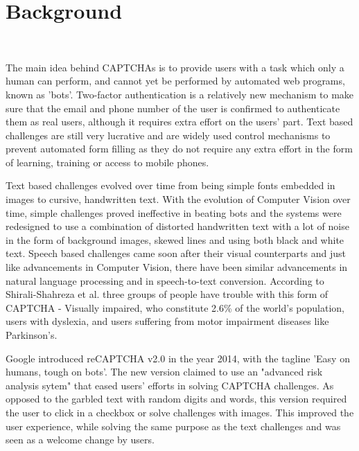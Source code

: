 \section{Background}{}\mbox \
\label{sec:background}

The main idea behind CAPTCHAs is to provide users with a task which only a human can perform, and cannot yet be performed by automated web programs, known as 'bots'. Two-factor authentication is a relatively new mechanism to make sure that the email and phone number of the user is confirmed to authenticate them as real users, although it requires extra effort on the users' part. Text based challenges are still very lucrative and are widely used control mechanisms to prevent automated form filling as they do not require any extra effort in the form of learning, training or access to mobile phones.\newline

Text based challenges evolved over time from being simple fonts embedded in images to cursive, handwritten text. With the evolution of Computer Vision over time, simple challenges proved ineffective in beating bots and the systems were redesigned to use a combination of distorted handwritten text with a lot of noise in the form of background images, skewed lines and using both black and white text. Speech based challenges came soon after their visual counterparts \cite{kochanski2002reverse, chan2003using} and just like advancements in Computer Vision, there have been similar advancements in natural language processing and in speech-to-text conversion. According to Shirali-Shahreza et al.\cite{shirali2011accessibility} three groups of people have trouble with this form of CAPTCHA - Visually impaired, who constitute 2.6\% of the world's population, users with dyslexia, and users suffering from motor impairment diseases like Parkinson's.\newline

Google introduced reCAPTCHA v2.0 in the year 2014, with the tagline 'Easy on humans, tough on bots'. The new version claimed to use an "advanced risk analysis sytem" that eased users' efforts in solving CAPTCHA challenges. As opposed to the garbled text with random digits and words, this version required the user to click in a checkbox or solve challenges with images. This improved the user experience, while solving the same purpose as the text challenges and was seen as a welcome change by users.\newline

